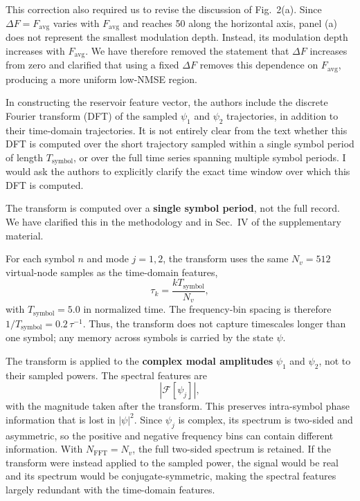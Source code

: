 \documentclass{ar2rc}
\begin{document}
This correction also required us to revise the discussion of Fig.~2(a). Since $\Delta F=F_{\mathrm{avg}}$ varies with $F_{\mathrm{avg}}$ and reaches 50 along the horizontal axis, panel (a) does not represent the smallest modulation depth. Instead, its modulation depth increases with $F_{\mathrm{avg}}$. We have therefore removed the statement that $\Delta F$ increases from zero and clarified that using a fixed $\Delta F$ removes this dependence on $F_{\mathrm{avg}}$, producing a more uniform low-NMSE region.

\RC \label{rev:1.4}In constructing the reservoir feature vector, the authors include the discrete Fourier transform (DFT) of the sampled $\psi_1$ and $\psi_2$ trajectories, in addition to their time-domain trajectories. It is not entirely clear from the text whether this DFT is computed over the short trajectory sampled within a single symbol period of length $T_{\text{symbol}}$, or over the full time series spanning multiple symbol periods. I would ask the authors to explicitly clarify the exact time window over which this DFT is computed.

\AR The transform is computed over a \textbf{single symbol period}, not the full record. We have clarified this in the methodology and in Sec.~IV of the supplementary material.

For each symbol $n$ and mode $j=1,2$, the transform uses the same $N_v=512$ virtual-node samples as the time-domain features,
\begin{equation}
	\tau_k = \frac{kT_{\mathrm{symbol}}}{N_v},
\end{equation}
with $T_{\mathrm{symbol}}=5.0$ in normalized time. The frequency-bin spacing is therefore $1/T_{\mathrm{symbol}}=0.2\,\tau^{-1}$. Thus, the transform does not capture timescales longer than one symbol; any memory across symbols is carried by the state $\psi$.

The transform is applied to the \textbf{complex modal amplitudes} $\psi_1$ and $\psi_2$, not to their sampled powers. The spectral features are
\begin{equation}
	\left|\mathcal{F}[\psi_j]\right|,
\end{equation}
with the magnitude taken after the transform. This preserves intra-symbol phase information that is lost in $|\psi|^2$. Since $\psi_j$ is complex, its spectrum is two-sided and asymmetric, so the positive and negative frequency bins can contain different information. With $N_{\mathrm{FFT}}=N_v$, the full two-sided spectrum is retained. If the transform were instead applied to the sampled power, the signal would be real and its spectrum would be conjugate-symmetric, making the spectral features largely redundant with the time-domain features.
\end{document}
